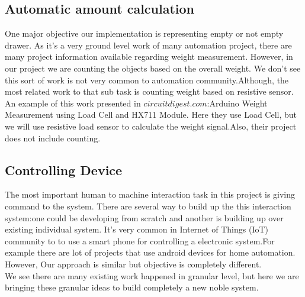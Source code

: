 \subsection{Automatic amount calculation}
One major objective our implementation is representing empty or not empty drawer. As it's a very ground level work of many automation project, there are many project information available regarding weight measurement. However, in our project we are counting the objects based on the overall weight. We don't see this sort of work is not very common to automation community.Although, the most related work to that sub task is counting weight based on resistive sensor. An example of this work presented in $circuitdigest.com$:Arduino Weight Measurement using Load Cell and HX711 Module. Here they use Load Cell, but we will use resistive load sensor to calculate the weight signal.Also, their project does not include counting.
\subsection{Controlling Device}
The most important human to machine interaction task in this project is giving command to the system. There are several way to build up the this interaction system:one could be developing from scratch and another is building up over existing individual system. It's very common in Internet of Things (IoT) community to to use a smart phone for controlling a electronic system.For example there are lot of projects that use android devices for home automation. However, Our approach is similar but objective is completely different.
\\
We see there are many existing work happened in granular level, but here we are bringing these granular ideas to build completely a new noble system.
